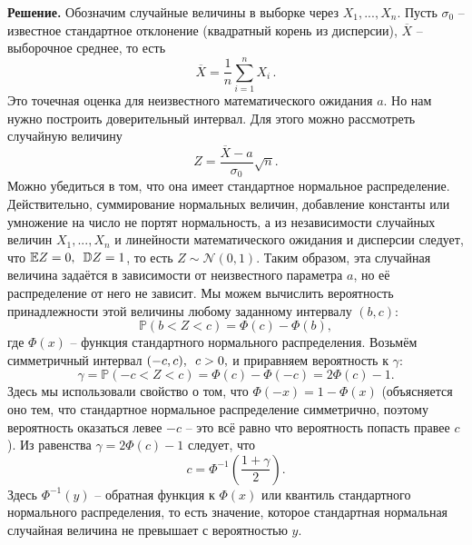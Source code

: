 \documentclass[12pt]{article}
\begin{document}
\noindent\textbf{Решение.} 
Обозначим случайные величины в выборке через $X_1, ..., X_n$. Пусть $\sigma_0$ -- известное стандартное отклонение (квадратный корень из дисперсии), $\overline{X}$ -- выборочное среднее, то есть
\begin{equation*}
    \overline{X} = \frac{1}{n} \sum\limits_{i=1}^{n}X_i\,.
\end{equation*}
Это точечная оценка для неизвестного математического ожидания $a$. Но нам нужно построить доверительный интервал. Для этого можно рассмотреть случайную величину
\begin{equation*}
    Z = \frac{\overline{X} - a}{\sigma_0}\sqrt{n}.
\end{equation*}
Можно убедиться в том, что она имеет стандартное нормальное распределение. Действительно, суммирование нормальных величин, добавление константы или умножение на число не портят нормальность, а из независимости случайных величин $X_1, ..., X_n$ и линейности математического ожидания и дисперсии следует, что $\mathbb{E}Z = 0, \enskip \mathbb{D}Z = 1$, то есть $Z \sim \mathcal N(0, 1)$. Таким образом, эта случайная величина задаётся в зависимости от неизвестного параметра $a$, но её распределение от него не зависит. Мы можем вычислить вероятность принадлежности этой величины любому заданному интервалу $(b, c)$:
\begin{equation*}
    \mathbb{P}(b < Z < c) = \Phi(c) - \Phi(b),
\end{equation*}
где $\Phi(x)$ -- функция стандартного нормального распределения. Возьмём симметричный интервал $(-c, c), \enskip c > 0,$ и приравняем вероятность к $\gamma$:
\begin{equation*}
    \gamma = \mathbb{P}(-c < Z < c) = \Phi(c) - \Phi(-c) = 2\Phi(c) - 1.
\end{equation*}
Здесь мы использовали свойство о том, что $\Phi(-x) = 1 - \Phi(x)$ (объясняется оно тем, что стандартное нормальное распределение симметрично, поэтому вероятность оказаться левее $-c$ -- это всё равно что вероятность попасть правее $c$). Из равенства $\gamma = 2\Phi(c) - 1$ следует, что
\begin{equation*}
    c = \Phi^{-1}\left(\frac{1 + \gamma}{2}\right).
\end{equation*}
Здесь $\Phi^{-1}(y)$ -- обратная функция к $\Phi(x)$ или квантиль стандартного нормального распределения, то есть значение, которое стандартная нормальная случайная величина не превышает с вероятностью $y$. 
\end{document}
